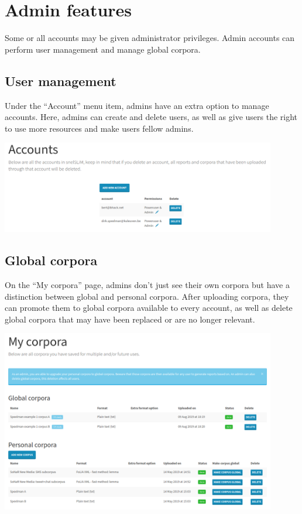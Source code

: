 \documentclass[11pt,a4paper]{article}
\begin{document}
\section{Admin features}

Some or all accounts may be given administrator privileges. Admin accounts can perform user management and manage global corpora.

\subsection{User management}

Under the ``Account'' menu item, admins have an extra option to manage accounts. Here, admins can create and delete users, as well as give users the right to use more resources and make users fellow admins.

\centerline{\includegraphics[width=0.9\textwidth]{images/users.png}}

\subsection{Global corpora}

On the ``My corpora'' page, admins don't just see their own corpora but have a distinction between global and personal corpora. After uploading corpora, they can promote them to global corpora available to every account, as well as delete global corpora that may have been replaced or are no longer relevant.

\centerline{\includegraphics[width=0.9\textwidth]{images/admincorpora.png}}
\end{document}
